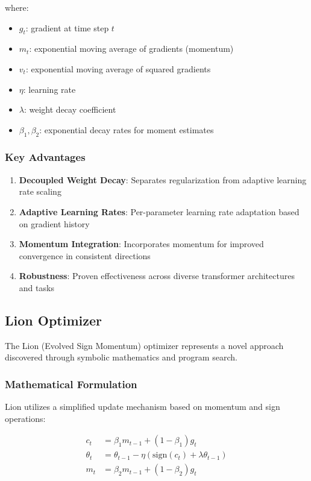 where:
\begin{itemize}
    \item $g_t$: gradient at time step $t$
    \item $m_t$: exponential moving average of gradients (momentum)
    \item $v_t$: exponential moving average of squared gradients
    \item $\eta$: learning rate
    \item $\lambda$: weight decay coefficient
    \item $\beta_1, \beta_2$: exponential decay rates for moment estimates
\end{itemize}

\subsubsection{Key Advantages}

\begin{enumerate}
    \item \textbf{Decoupled Weight Decay}: Separates regularization from adaptive learning rate scaling
    \item \textbf{Adaptive Learning Rates}: Per-parameter learning rate adaptation based on gradient history
    \item \textbf{Momentum Integration}: Incorporates momentum for improved convergence in consistent directions
    \item \textbf{Robustness}: Proven effectiveness across diverse transformer architectures and tasks
\end{enumerate}

\subsection{Lion Optimizer}

The Lion (Evolved Sign Momentum) optimizer \cite{chen2023symbolic} represents a novel approach discovered through symbolic mathematics and program search.

\subsubsection{Mathematical Formulation}

Lion utilizes a simplified update mechanism based on momentum and sign operations:

\begin{align}
c_t &= \beta_1 m_{t-1} + (1 - \beta_1) g_t \\
\theta_t &= \theta_{t-1} - \eta \left( \text{sign}(c_t) + \lambda \theta_{t-1} \right) \\
m_t &= \beta_2 m_{t-1} + (1 - \beta_2) g_t
\end{align}

